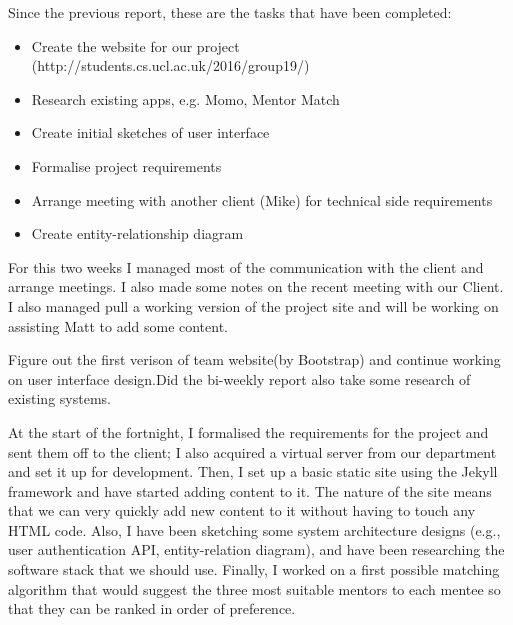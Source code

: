 \documentclass[11pt]{report}
\begin{document}
\bigskip
{}
\smallskip

\noindent
Since the previous report, these are the tasks that have been completed:
\begin{itemize}
    \item Create the website for our project (http://students.cs.ucl.ac.uk/2016/group19/)
    \item Research existing apps, e.g. Momo, Mentor Match
    \item Create initial sketches of user interface
    \item Formalise project requirements
    \item Arrange meeting with another client (Mike) for technical side requirements
    \item Create entity-relationship diagram
\end{itemize}

\bigskip
{}
\smallskip

\noindent
For this two weeks I managed most of the communication with the client and arrange meetings. I also made some notes on the recent meeting with our Client. I also managed pull a working version of the project site and will be working on assisting Matt to add some content.\\

\bigskip
{}
\smallskip

\noindent
Figure out the first verison of team website(by Bootstrap) and continue working on user interface design.Did the bi-weekly report also take some research of existing systems.\\

\pagebreak
\bigskip
{}
\smallskip

\noindent
At the start of the fortnight, I formalised the requirements for the project and sent them off to the client; I also acquired a virtual server from our department and set it up for development. Then, I set up a basic static site using the Jekyll framework and have started adding content to it. The nature of the site means that we can very quickly add new content to it without having to touch any HTML code. Also, I have been sketching some system architecture designs (e.g., user authentication API, entity-relation diagram), and have been researching the software stack that we should use. Finally, I worked on a first possible matching algorithm that would suggest the three most suitable mentors to each mentee so that they can be ranked in order of preference. \\
\end{document}

